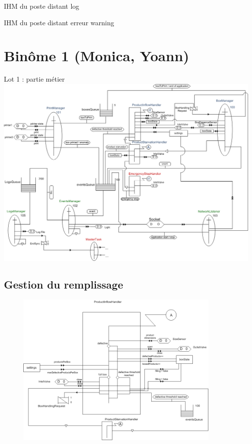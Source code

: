\documentclass{beamer}
\begin{document}
	\begin{frame}
		IHM du poste distant
		log
	\end{frame}

	\begin{frame}
		IHM du poste distant
		erreur \/ warning
	\end{frame}

\section{Binôme 1 (Monica, Yoann)}
	\begin{frame}
	\begin{center}
		\huge Lot 1 : partie métier
		\includegraphics[height=0.8\textheight]{../../SchemasLCG/schemaGlobal.png}
	\end{center}
	\end{frame}

\subsection{Gestion du remplissage}
	\begin{frame}
	\begin{figure}
		\centering
		\includegraphics[width=0.9\textwidth]{../../SchemasLCG/ProductInflowHandler.png}
	\end{figure}
	\end{frame}
\end{document}
